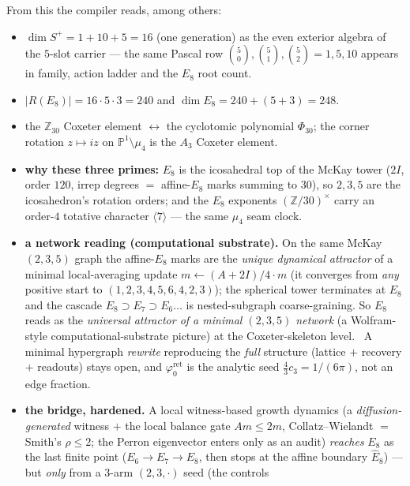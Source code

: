 \documentclass[11pt,a4paper]{article}
\newcommand{\phiz}{\varphi_0^{\mathrm{ret}}}
\newcommand{\Z}{\mathbb{Z}}
\newcommand{\PP}{\mathbb{P}}
\begin{document}
\noindent From this the compiler reads, among others:
\begin{itemize}[leftmargin=1.4em]
\item $\dim S^+ = 1+10+5 = 16$ (one generation) as the even exterior algebra of the $5$-slot carrier ---
      the same Pascal row $\binom50,\binom51,\binom52 = 1,5,10$ appears in family, action ladder and the
      $E_8$ root count. \mE
\item $|R(E_8)| = 16\cdot5\cdot3 = 240$ and $\dim E_8 = 240 + (5+3) = 248$. \mE
\item the $\Z_{30}$ Coxeter element $\leftrightarrow$ the cyclotomic polynomial $\Phi_{30}$; the corner
      rotation $z\mapsto iz$ on $\PP^1\!\setminus\!\mu_4$ is the $A_3$ Coxeter element. \mE
\item \textbf{why these three primes:} $E_8$ is the icosahedral top of the McKay tower
      ($2I$, order $120$, irrep degrees $=$ affine-$E_8$ marks summing to $30$), so $2,3,5$ are the
      icosahedron's rotation orders; and the $E_8$ exponents $(\Z/30)^\times$ carry an order-$4$ totative
      character $\langle7\rangle$ --- the same $\mu_4$ seam clock. \mE\
       
\item \textbf{a network reading (computational substrate).} On the same McKay $(2,3,5)$ graph the affine-$E_8$
      marks are the \emph{unique dynamical attractor} of a minimal local-averaging update
      $m\!\leftarrow\!(A{+}2I)/4\cdot m$ (it converges from \emph{any} positive start to $(1,2,3,4,5,6,4,2,3)$);
      the spherical tower terminates at $E_8$ and the cascade $E_8\!\supset\!E_7\!\supset\!E_6\!\dots$ is
      nested-subgraph coarse-graining. So $E_8$ reads as the \emph{universal attractor of a minimal $(2,3,5)$
      network} (a Wolfram-style computational-substrate picture) at the Coxeter-skeleton level. \mC\ A minimal
      hypergraph \emph{rewrite} reproducing the \emph{full} structure (lattice $+$ recovery $+$ readouts) stays
      open, and $\phiz$ is the analytic seed $\tfrac{4}{3}c_3=1/(6\pi)$, not an edge fraction. \mO\
\item \textbf{the bridge, hardened.} A local witness-based growth dynamics (a \emph{diffusion-generated} witness
      $+$ the local balance gate $A m\le2m$, Collatz--Wielandt $=$ Smith's $\rho\le2$; the Perron eigenvector
      enters only as an audit) \emph{reaches} $E_8$ as the last finite point ($E_6\!\to\!E_7\!\to\!E_8$, then
      stops at the affine boundary $\hat E_8$) --- but \emph{only} from a 3-arm $(2,3,\cdot)$ seed (the controls

\end{itemize}
\end{document}
